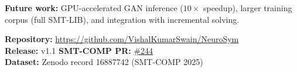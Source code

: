 \documentclass[10pt,twocolumn]{article}
\begin{document}
\noindent\textbf{Future work:}
GPU-accelerated GAN inference ($10{\times}$ speedup),
larger training corpus (full SMT-LIB),
and integration with incremental solving.

\vspace{4pt}
\noindent\small
\textbf{Repository:}
\url{https://github.com/VishalKumarSwain/NeuroSym}\\
\textbf{Release:} v1.1 \quad
\textbf{SMT-COMP PR:} \href{https://github.com/SMT-COMP/smt-comp.github.io/pull/244}{\#244}\\
\textbf{Dataset:} Zenodo record 16887742 (SMT-COMP 2025)

\end{document}
